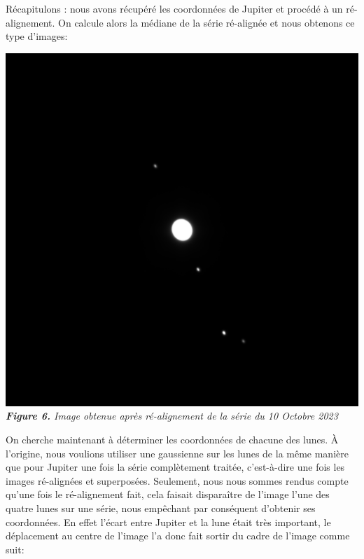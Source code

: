 \documentclass{aa}
\begin{document}
Récapitulons : nous avons récupéré les coordonnées de Jupiter et procédé à un ré-alignement. On calcule alors la médiane de la série ré-alignée et nous obtenons ce type d'images: 

\begin{center}
    \includegraphics[scale = 0.22]{images/apres_realignement.png}
    \emph{\textbf{Figure 6.} Image obtenue après ré-alignement de la série du 10 Octobre 2023}
\end{center}

On cherche maintenant à déterminer les coordonnées de chacune des lunes. À l'origine, nous voulions utiliser une gaussienne sur les lunes de la même manière que pour Jupiter une fois la série complètement traitée, c'est-à-dire une fois les images ré-alignées et superposées. Seulement, nous nous sommes rendus compte qu'une fois le ré-alignement fait, cela faisait disparaître de l'image l'une des quatre lunes sur une série, nous empêchant par conséquent d'obtenir ses coordonnées. En effet l'écart entre Jupiter et la lune était très important, le déplacement au centre de l'image l'a donc fait sortir du cadre de l'image comme suit:
\end{document}
